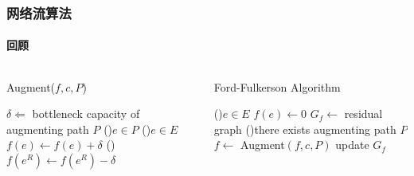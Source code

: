     \begin{frame}[plain]
        \frametitle{网络流算法}
        \framesubtitle{回顾}
        \begin{columns}
            \begin{column}{0.5\textwidth}
                \begin{algorithm}[H]
                    \caption{Augment($f,c,P$)}
                    $\delta\Leftarrow$ bottleneck capacity of augmenting path $P$\;
                    \ForEach(){$e\in P$}{
                        \If(){$e\in E$}{
                            $f(e)\leftarrow f(e)+\delta$\;
                        }
                        \Else(){
                            $f(e^R)\leftarrow f(e^R)-\delta$\;
                        }
                    }
                    \;
                \end{algorithm}
            \end{column}
            \begin{column}{0.5\textwidth}
                \begin{algorithm}[H]
                    \caption{Ford-Fulkerson Algorithm}
                    \ForEach(){$e\in E$}{
                        $f(e)\leftarrow 0$\;
                    }
                    $G_f\leftarrow$ residual graph\;
                    \While(){there exists augmenting path $P$}{
                        $f\leftarrow$ Augment$(f,c,P)$\;
                        update $G_f$\;
                    }
                    \;
                \end{algorithm}
            \end{column}
        \end{columns}
    \end{frame}    

